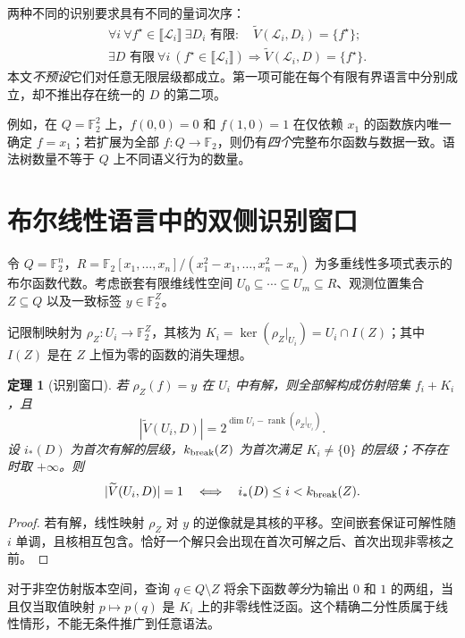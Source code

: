 \documentclass[11pt,a4paper,UTF8,fontset=none]{ctexart}
\newtheorem{theorem}{定理}[section]
\newcommand{\F}{\mathbb{F}}
\newcommand{\sem}[1]{\llbracket #1\rrbracket}
\newcommand{\VS}{\widetilde V}
\begin{document}
两种不同的识别要求具有不同的量词次序：
\begin{align}\label{eq:quantifiers}
&\forall i\ \forall f^\star\in\sem{\mathcal L_i}\ \exists D_i\text{ 有限}:\quad
 \VS(\mathcal L_i,D_i)=\{f^\star\};\\
&\exists D\text{ 有限}\ \forall i\ (f^\star\in\sem{\mathcal L_i})\Rightarrow
 \VS(\mathcal L_i,D)=\{f^\star\}.
\end{align}
本文\emph{不预设}它们对任意无限层级都成立。第一项可能在每个有限有界语言中分别成立，却不推出存在统一的 $D$ 的第二项。

例如，在 $Q=\F_2^2$ 上，$f(0,0)=0$ 和 $f(1,0)=1$ 在仅依赖 $x_1$ 的函数族内唯一确定 $f=x_1$；若扩展为全部 $f:Q\to\F_2$，则仍有\emph{四个}完整布尔函数与数据一致。语法树数量不等于 $Q$ 上不同语义行为的数量。

\section{布尔线性语言中的双侧识别窗口}

令 $Q=\F_2^n$，$R=\F_2[x_1,\ldots,x_n]/(x_1^2-x_1,\ldots,x_n^2-x_n)$ 为多重线性多项式表示的布尔函数代数。考虑嵌套有限维线性空间 $U_0\subseteq\cdots\subseteq U_m\subseteq R$、观测位置集合 $Z\subseteq Q$ 以及一致标签 $y\in\F_2^Z$。

记限制映射为 $\rho_Z:U_i\to\F_2^Z$，其核为 $K_i=\ker(\rho_Z|_{U_i})=U_i\cap I(Z)$；其中 $I(Z)$ 是在 $Z$ 上恒为零的函数的消失理想。

\begin{theorem}[识别窗口]\label{thm:window}
若 $\rho_Z(f)=y$ 在 $U_i$ 中有解，则全部解构成仿射陪集 $f_i+K_i$，且
\begin{equation}\label{eq:affine}
|\VS(U_i,D)|=2^{\dim U_i-\operatorname{rank}(\rho_Z|_{U_i})}.
\end{equation}
设 $i_*(D)$ 为首次有解的层级，$k_{\rm break}(Z)$ 为首次满足 $K_i\ne\{0\}$ 的层级；不存在时取 $+\infty$。则
\begin{equation}\label{eq:window}
|\VS(U_i,D)|=1\quad\Longleftrightarrow\quad i_*(D)\le i<k_{\rm break}(Z).
\end{equation}
\end{theorem}
\begin{proof}
若有解，线性映射 $\rho_Z$ 对 $y$ 的逆像就是其核的平移。空间嵌套保证可解性随 $i$ 单调，且核相互包含。恰好一个解只会出现在首次可解之后、首次出现非零核之前。
\end{proof}

对于非空仿射版本空间，查询 $q\in Q\setminus Z$ 将余下函数\emph{等分}为输出 $0$ 和 $1$ 的两组，当且仅当取值映射 $p\mapsto p(q)$ 是 $K_i$ 上的非零线性泛函。这个精确二分性质属于线性情形，不能无条件推广到任意语法。
\end{document}
